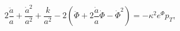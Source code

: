 \begin{equation}
2\frac{\ddot a}{a}+\frac{\dot a^2}{a^2}+\frac{k}{a^2}
-2\left(\ddot\Phi+2\frac{\dot a}{a}\dot\Phi-\dot\Phi^2\right) = 
-\kappa^2 e^\Phi p_{T},
\label{metric3-2}
\end{equation}


